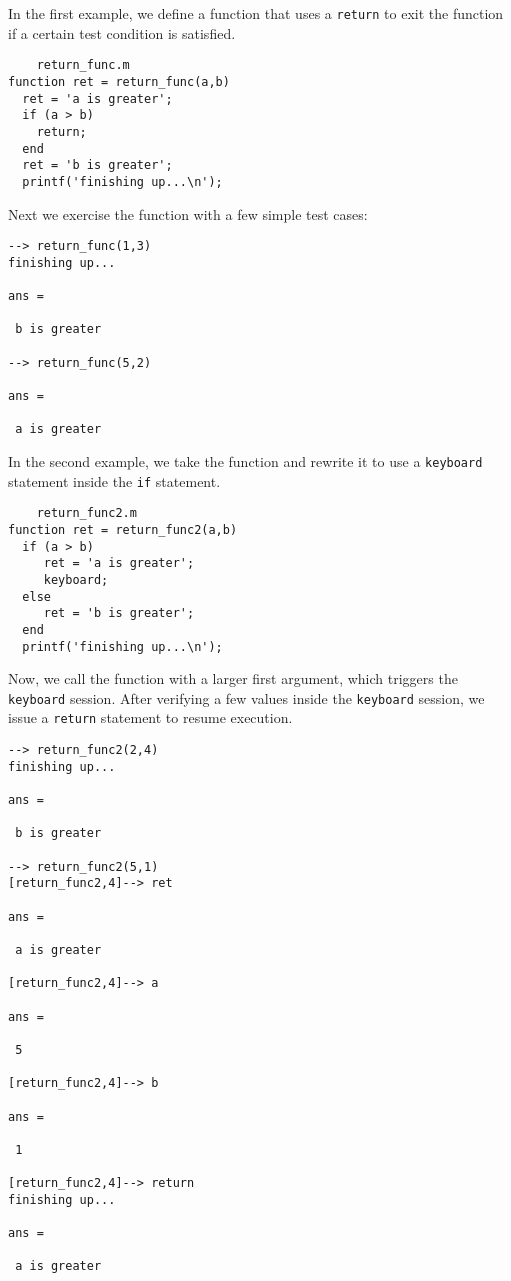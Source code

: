 In the first example, we define a function that uses a
\verb|return| to exit the function if a certain test condition 
is satisfied.
\begin{verbatim}
    return_func.m
function ret = return_func(a,b)
  ret = 'a is greater';
  if (a > b)
    return;
  end
  ret = 'b is greater';
  printf('finishing up...\n');
\end{verbatim}
Next we exercise the function with a few simple test
cases:
\begin{verbatim}
--> return_func(1,3)
finishing up...

ans = 

 b is greater

--> return_func(5,2)

ans = 

 a is greater
\end{verbatim}
In the second example, we take the function and rewrite
it to use a \verb|keyboard| statement inside the \verb|if| statement.
\begin{verbatim}
    return_func2.m
function ret = return_func2(a,b)
  if (a > b)
     ret = 'a is greater';
     keyboard;
  else
     ret = 'b is greater';
  end
  printf('finishing up...\n');
\end{verbatim}
Now, we call the function with a larger first argument, which
triggers the \verb|keyboard| session.  After verifying a few
values inside the \verb|keyboard| session, we issue a \verb|return|
statement to resume execution.
\begin{verbatim}
--> return_func2(2,4)
finishing up...

ans = 

 b is greater

--> return_func2(5,1)
[return_func2,4]--> ret

ans = 

 a is greater

[return_func2,4]--> a

ans = 

 5 

[return_func2,4]--> b

ans = 

 1 

[return_func2,4]--> return
finishing up...

ans = 

 a is greater
\end{verbatim}
